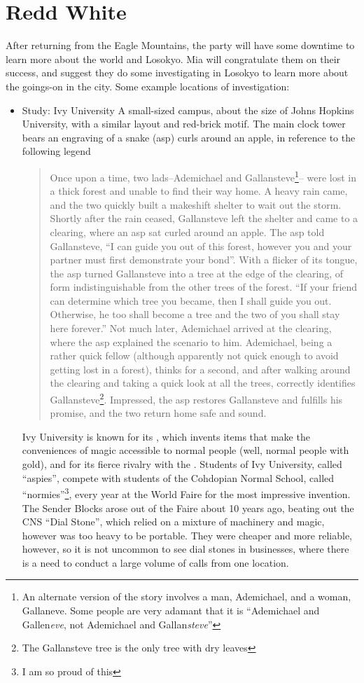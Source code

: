 \section{Redd White}
After returning from the Eagle Mountains, the party will have some downtime to learn more about the world and Losokyo. Mia will congratulate them on their success, and suggest they do some investigating in Losokyo to learn more about the goings-on in the city. Some example locations of investigation:
\begin{itemize}
\item Study: Ivy University
A small-sized campus, about the size of Johns Hopkins University, with a similar layout and red-brick motif. The main clock tower bears an engraving of a snake (asp) curls around an apple, in reference to the following legend
\begin{quote}
Once upon a time, two lads--Ademichael and Gallansteve\footnote{An alternate version of the story involves a man, Ademichael, and a woman, Gallaneve. Some people are very adamant that it is ``Ademichael and Gallen\textit{eve}, not Ademichael and Gallan\textit{steve}''}-- were lost in a thick forest and unable to find their way home. A heavy rain came, and the two quickly built a makeshift shelter to wait out the storm. Shortly after the rain ceased, Gallansteve left the shelter and came to a clearing, where an asp sat curled around an apple. The asp told Gallansteve, ``I can guide you out of this forest, however you and your partner must first demonstrate your bond''. With a flicker of its tongue, the asp turned Gallansteve into a tree at the edge of the clearing, of form indistinguishable from the other trees of the forest. ``If your friend can determine which tree you became, then I shall guide you out. Otherwise, he too shall become a tree and the two of you shall stay here forever.'' Not much later, Ademichael arrived at the clearing, where the asp explained the scenario to him. Ademichael, being a rather quick fellow (although apparently not quick enough to avoid getting lost in a forest), thinks for a second, and after walking around the clearing and taking a quick look at all the trees, correctly identifies Gallansteve\footnote{The Gallansteve tree is the only tree with dry leaves}. Impressed, the asp restores Gallansteve and fulfills his promise, and the two return home safe and sound.
\end{quote}
Ivy University is known for its , which invents items that make the conveniences of magic accessible to normal people (well, normal people with gold), and for its fierce rivalry with the . Students of Ivy University, called ``aspies'', compete with students of the Cohdopian Normal School, called ``normies''\footnote{I am so proud of this}, every year at the World Faire for the most impressive invention. The Sender Blocks arose out of the Faire about 10 years ago, beating out the CNS ``Dial Stone'', which relied on a mixture of machinery and magic, however was too heavy to be portable. They were cheaper and more reliable, however, so it is not uncommon to see dial stones in businesses, where there is a need to conduct a large volume of calls from one location.


\end{itemize}
